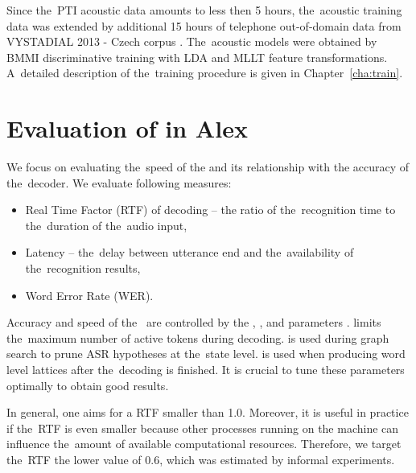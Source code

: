 Since the~PTI acoustic data amounts to less then 5 hours, the~acoustic training data was extended by additional 15 hours of telephone out-of-domain data from VYSTADIAL 2013 - Czech corpus \cite{korvas_2014}.
The~acoustic models were obtained by BMMI discriminative training with LDA and MLLT feature transformations.
A~detailed description of the~training procedure is given in Chapter~\ref{cha:train}. 


\section{Evaluation of  in Alex}
\label{sec:eval}
We focus on evaluating the~speed of the  and its relationship with the accuracy of the~decoder.
We evaluate following measures:
\begin{itemize}
    \item Real Time Factor (RTF) of decoding -- the ratio of the~recognition time to the~duration of the~audio input,
    \item Latency -- the~delay between utterance end and the~availability of the~recognition results,
    \item Word Error Rate (WER).
\end{itemize}

Accuracy and speed of the~ are controlled by the ,   , and  parameters \cite{povey2011kaldi}.
 limits the~maximum number of active tokens during decoding.
 is used during graph search to prune ASR hypotheses at the~state level.
 is used when producing word level lattices after the~decoding is finished.
It is crucial to tune these parameters optimally to obtain good results.

In general, one aims for a \ac{RTF} smaller than 1.0.
Moreover, it is useful in practice if the~RTF is even smaller because other processes running on the machine can influence the~amount of available computational resources.
Therefore, we target the~RTF the lower value of 0.6, which was estimated by informal experiments.

